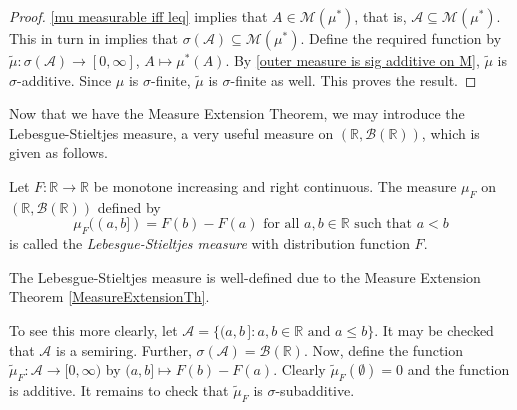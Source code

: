 \begin{proof}
    \cref{mu measurable iff leq} implies that $A\in\mathcal{M}(\mu^*)$, that is, $\mathcal{A}\subseteq\mathcal{M}(\mu^*)$. This in turn in implies that $\sigma(\mathcal{A})\subseteq\mathcal{M}(\mu^*)$. Define the required function by $\tilde\mu:\sigma(\mathcal{A})\to[0,\infty]$, $A\mapsto\mu^*(A)$. By \cref{outer measure is sig additive on M}, $\tilde\mu$ is $\sigma$-additive. Since $\mu$ is $\sigma$-finite, $\tilde\mu$ is $\sigma$-finite as well. This proves the result.
\end{proof}

Now that we have the Measure Extension Theorem, we may introduce the Lebesgue-Stieltjes measure, a very useful measure on $(\mathbb{R},\mathcal{B}(\mathbb{R}))$, which is given as follows.

\begin{definition}
\label{defLebStielMeasure}
    Let $F:\mathbb{R}\to\mathbb{R}$ be monotone increasing and right continuous. The measure $\mu_F$ on $(\mathbb{R},\mathcal{B}(\mathbb{R}))$ defined by 
    $$\mu_F((a,b])= F(b)-F(a)\text{ for all $a,b\in\mathbb{R}$ such that $a<b$}$$
    is called the \textit{Lebesgue-Stieltjes measure} with distribution function $F$.
\end{definition}

The Lebesgue-Stieltjes measure is well-defined due to the Measure Extension Theorem \cref{MeasureExtensionTh}.

\vspace{1mm}
To see this more clearly, let $\mathcal{A}=\{(a,b\,]:a,b\in\mathbb{R}\text{ and }a\leq b\}$. It may be checked that $\mathcal{A}$ is a semiring. Further, $\sigma(\mathcal{A})=\mathcal{B}(\mathbb{R})$. Now, define the function $\tilde\mu_F:\mathcal{A}\to[0,\infty)$ by $(a,b]\mapsto F(b)-F(a)$. Clearly $\tilde\mu_F(\emptyset)=0$ and the function is additive. It remains to check that $\tilde\mu_F$ is $\sigma$-subadditive.

